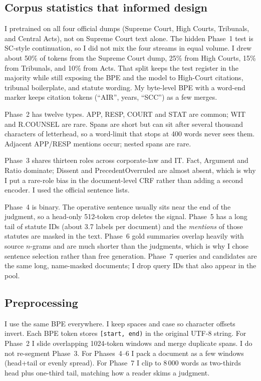 \documentclass[11pt, oneside]{article}
\begin{document}
\subsection{Corpus statistics that informed design}
I pretrained on all four official dumps (Supreme Court, High Courts, Tribunals, and Central Acts), not on Supreme Court text alone. The hidden Phase~1 test is SC-style continuation, so I did not mix the four streams in equal volume. I drew about 50\% of tokens from the Supreme Court dump, 25\% from High Courts, 15\% from Tribunals, and 10\% from Acts. That split keeps the test register in the majority while still exposing the BPE and the model to High-Court citations, tribunal boilerplate, and statute wording. My byte-level BPE with a word-end marker keeps citation tokens (``AIR'', years, ``SCC'') as a few merges.

Phase~2 has twelve types. APP, RESP, COURT and STAT are common; WIT and R.COUNSEL are rare. Spans are short but can sit after several thousand characters of letterhead, so a word-limit that stops at 400 words never sees them. Adjacent APP/RESP mentions occur; nested spans are rare.

Phase~3 shares thirteen roles across corporate-law and IT. Fact, Argument and Ratio dominate; Dissent and PrecedentOverruled are almost absent, which is why I put a rare-role bias in the document-level CRF rather than adding a second encoder. I used the official sentence lists.

Phase~4 is binary. The operative sentence usually sits near the end of the judgment, so a head-only 512-token crop deletes the signal. Phase~5 has a long tail of statute IDs (about 3.7 labels per document) and the \emph{mentions} of those statutes are masked in the text. Phase~6 gold summaries overlap heavily with source $n$-grams and are much shorter than the judgments, which is why I chose sentence selection rather than free generation. Phase~7 queries and candidates are the same long, name-masked documents; I drop query IDs that also appear in the pool.

\subsection{Preprocessing}
I use the same BPE everywhere. I keep spaces and case so character offsets invert. Each BPE token stores \texttt{[start, end)} in the original UTF-8 string. For Phase~2 I slide overlapping 1024-token windows and merge duplicate spans. I do not re-segment Phase~3. For Phases~4--6 I pack a document as a few windows (head+tail or evenly spread). For Phase~7 I clip to 8\,000 words as two-thirds head plus one-third tail, matching how a reader skims a judgment.
\end{document}
